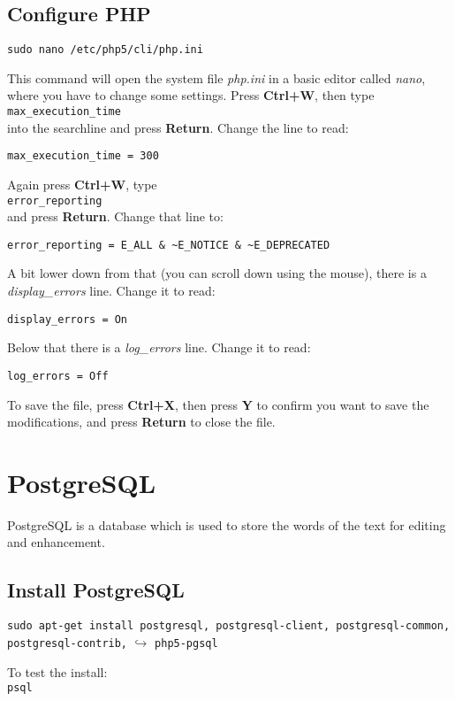 \documentclass[a4paper,10pt]{article}
\begin{document}
\subsection{Configure PHP}

\verb|sudo nano /etc/php5/cli/php.ini|

This command will open the system file \textit{php.ini} in a basic editor called \textit{nano}, where you have to change some settings. Press \textbf{Ctrl+W}, then type\\
\verb|max_execution_time|\\
into the searchline and press \textbf{Return}. Change the line to read:

\verb|max_execution_time = 300|

Again press \textbf{Ctrl+W}, type\\
\verb|error_reporting| \\
and press \textbf{Return}. Change that line to: 

\verb|error_reporting = E_ALL & ~E_NOTICE & ~E_DEPRECATED|

A bit lower down from that (you can scroll down using the mouse), there is a \textit{display\_errors} line. Change it to read: 

\verb|display_errors = On|

Below that there is a \textit{log\_errors} line. Change it to read: 

\verb|log_errors = Off|

To save the file, press \textbf{Ctrl+X}, then press \textbf{Y} to confirm you want to save the modifications, and press \textbf{Return} to close the file.


\section{PostgreSQL}

PostgreSQL is a database which is used to store the words of the text for editing and enhancement.

\subsection{Install PostgreSQL}

\verb|sudo apt-get install postgresql, postgresql-client, postgresql-common, postgresql-contrib,|
$\hookrightarrow$ \verb|php5-pgsql|

To test the install:\\
\verb|psql|
\end{document}
